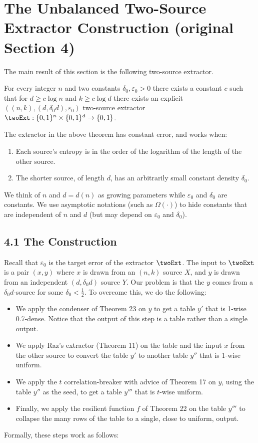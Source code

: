 \section*{The Unbalanced Two-Source Extractor Construction (original Section 4)}
The main result of this section is the following two-source extractor.
\begin{theorem}
For every integer $n$ and two constants $\delta_0,\varepsilon_0>0$ there exists a constant $c$ such that for $d\ge c\log n$ and $k\ge c\log d$ there exists an explicit $((n,k),(d,\delta_0d),\varepsilon_0)$ two-source extractor $\twoExt:\{0,1\}^n\times\{0,1\}^d\to\{0,1\}$.
\end{theorem}
The extractor in the above theorem has constant error, and works when:
\begin{enumerate}
\item Each source's entropy is in the order of the logarithm of the length of the other source.
\item The shorter source, of length $d$, has an arbitrarily small constant density $\delta_0$.
\end{enumerate}
We think of $n$ and $d=d(n)$ as growing parameters while $\varepsilon_0$ and $\delta_0$ are constants. We use asymptotic notations (such as $\Omega(\cdot)$) to hide constants that are independent of $n$ and $d$ (but may depend on $\varepsilon_0$ and $\delta_0$).
\subsection*{4.1 The Construction}
Recall that $\varepsilon_0$ is the target error of the extractor $\twoExt$. The input to $\twoExt$ is a pair $(x,y)$ where $x$ is drawn from an $(n,k)$ source $X$, and $y$ is drawn from an independent $(d,\delta_0d)$ source $Y$. Our problem is that the $y$ comes from a $\delta_0d$-source for some $\delta_0<\frac12$. To overcome this, we do the following:
\begin{itemize}
\item We apply the condenser of Theorem 23 on $y$ to get a table $y'$ that is 1-wise 0.7-dense. Notice that the output of this step is a table rather than a single output.
\item We apply Raz's extractor (Theorem 11) on the table and the input $x$ from the other source to convert the table $y'$ to another table $y''$ that is 1-wise uniform.
\item We apply the $t$ correlation-breaker with advice of Theorem 17 on $y$, using the table $y''$ as the seed, to get a table $y'''$ that is $t$-wise uniform.
\item Finally, we apply the resilient function $f$ of Theorem 22 on the table $y'''$ to collapse the many rows of the table to a single, close to uniform, output.
\end{itemize}
Formally, these steps work as follows:

